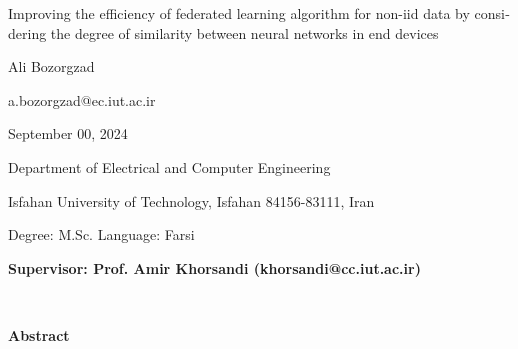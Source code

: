 \thispagestyle{empty}

\begin{latin}
\begin{center}

{\huge
Improving the efficiency of federated learning algorithm for non-iid data by considering the degree of similarity between neural networks in end devices
}

\vspace{1cm}

{\LARGE{Ali Bozorgzad}}

\vspace{0.2cm}

{\small a.bozorgzad@ec.iut.ac.ir}

\vspace{0.5cm}

September 00, 2024

\vspace{0.5cm}

Department of Electrical and Computer Engineering

\vspace{0.2cm}

Isfahan University of Technology, Isfahan 84156-83111, Iran

\vspace{0.2cm}

Degree: M.Sc. \hspace*{3cm} Language: Farsi

\vspace{1cm}

{\small\textbf{Supervisor: Prof. Amir Khorsandi (khorsandi@cc.iut.ac.ir)}}
\end{center}
~\vfill



\noindent\textbf{Abstract}


\end{latin}
